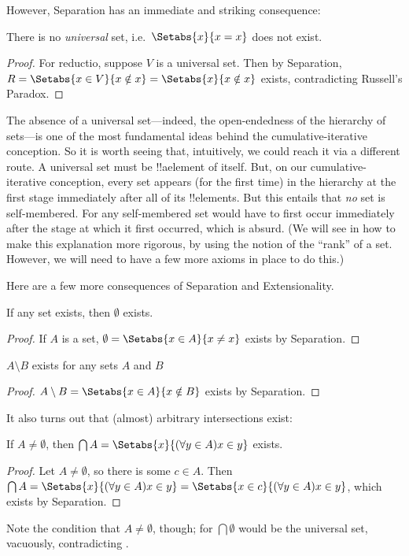 \documentclass[../../../include/open-logic-section]{subfiles}
\begin{document}
However, Separation has an immediate and striking consequence:
\begin{thm}There is no \emph{universal} set, i.e.\ $\Setabs{x}{x = x}$ does not exist.
\end{thm}
\begin{proof}
	For reductio, suppose $V$ is a universal set. Then by Separation, $R = \Setabs{x \in V}{x \notin x} = \Setabs{x}{x \notin x}$ exists, contradicting Russell's Paradox. 
\end{proof}\noindent
The absence of a universal set---indeed, the open-endedness of the hierarchy of sets---is one of the most fundamental ideas behind the cumulative-iterative conception. So it is worth seeing that, intuitively, we could reach it via a different route. A universal set must be !!a{element} of itself. But, on our cumulative-iterative conception, every set appears (for the first time) in the hierarchy at the first stage immediately after all of its !!{element}s. But this entails that \emph{no} set is self-membered. For any self-membered set would have to first occur immediately after the stage at which it first occurred, which is absurd. (We will see in  how to make this explanation more rigorous, by using the notion of the ``rank'' of a set. However, we will need to have a few more axioms in place to do this.)

Here are a few more consequences of Separation and Extensionality.
\begin{prop}If any set exists, then $\emptyset$ exists.
\end{prop}
\begin{proof}
	If $A$ is a set, $\emptyset = \Setabs{x \in A}{x \neq x}$ exists by Separation.
\end{proof}
\begin{prop}
	$A \setminus B$ exists for any sets $A$ and $B$
\end{prop}
\begin{proof}
	$A \setminus B = \Setabs{x \in A}{x \notin B}$ exists by Separation.
\end{proof}\noindent
It also turns out that (almost) arbitrary intersections exist:
\begin{prop}If $A \neq \emptyset$, then $\bigcap A = \Setabs{x}{(\forall y \in A)x \in y}$ exists.
	\begin{proof}
		Let $A \neq \emptyset$, so there is some $c \in A$. Then $\bigcap A = \Setabs{x}{(\forall y \in A)x \in y} = \Setabs{x \in c}{(\forall y \in A)x \in y}$, which exists by Separation. 
	\end{proof}
\end{prop}\noindent
Note the condition that $A \neq \emptyset$, though; for $\bigcap \emptyset$ would be the universal set, vacuously, contradicting .
\end{document}
